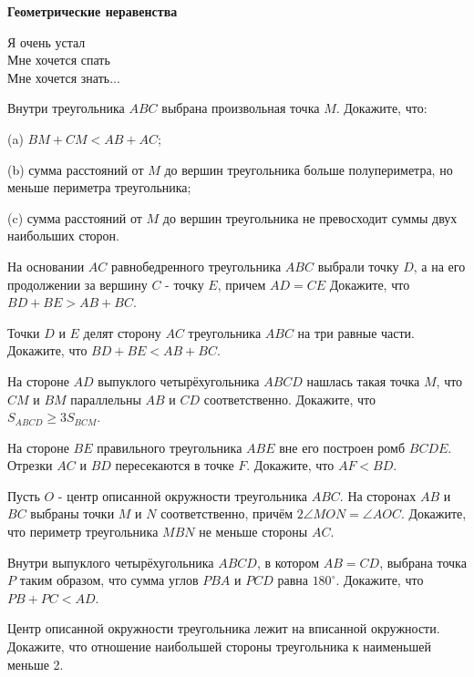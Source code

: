 \centerline{\bf \Huge Геометрические неравенства}

\begin{flushright}
        \scriptsize{Я очень устал\\
                    Мне хочется спать\\
                    Мне хочется знать...}
\end{flushright}

Внутри треугольника $A B C$ выбрана произвольная точка $M$. Докажите, что:

(a) $B M+C M<A B+A C$;

(b) сумма расстояний от $M$ до вершин треугольника больше полупериметра, но меньше периметра треугольника;

(c) сумма расстояний от $M$ до вершин треугольника не превосходит суммы двух наибольших сторон.

На основании $A C$ равнобедренного треугольника $A B C$ выбрали точку $D$, а на его продолжении за вершину $C$ - точку $E$, причем $A D=C E$ Докажите, что $B D+B E> A B+B C$.

Точки $D$ и $E$ делят сторону $A C$ треугольника $A B C$ на три равные части. Докажите, что $B D+B E<A B+B C$.

На стороне $A D$ выпуклого четырёхугольника $A B C D$ нашлась такая точка $M$, что $C M$ и $B M$ параллельны $A B$ и $C D$ соответственно. Докажите, что $S_{A B C D} \geqslant 3 S_{B C M}$.

На стороне $B E$ правильного треугольника $A B E$ вне его построен ромб $B C D E$. Отрезки $A C$ и $B D$ пересекаются в точке $F$. Докажите, что $A F<B D$.

Пусть $O$ - центр описанной окружности треугольника $A B C$. На сторонах $A B$ и $B C$ выбраны точки $M$ и $N$ соответственно, причём $2 \angle M O N=\angle A O C$. Докажите, что периметр треугольника $M B N$ не меньше стороны $A C$.

Внутри выпуклого четырёхугольника $A B C D$, в котором $A B=C D$, выбрана точка $P$ таким образом, что сумма углов $P B A$ и $P C D$ равна $180^{\circ}$. Докажите, что $P B+P C<A D$.

Центр описанной окружности треугольника лежит на вписанной окружности. Докажите, что отношение наибольшей стороны треугольника к наименьшей меньше 2.